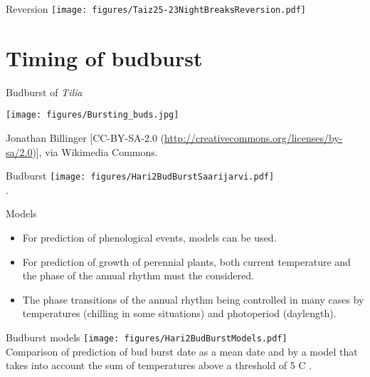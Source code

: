\documentclass[10pt]{beamer}
\begin{document}
\begin{frame}{Reversion}
    \centering
    \texttt{[image: figures/Taiz25-23NightBreaksReversion.pdf]}\\
    {\small \autocite[from][]{TaiZei2006}}
\end{frame}


\section{Timing of budburst}

\begin{frame}{Budburst of \emph{Tilia}}
    \begin{centering}
    \texttt{[image: figures/Bursting\_buds.jpg]}\\
    \end{centering}
    {\small Jonathan Billinger [CC-BY-SA-2.0 (\url{http://creativecommons.org/licenses/by-sa/2.0})], via Wikimedia Commons.}
\end{frame}

\begin{frame}{Budburst}
    \centering
    \texttt{[image: figures/Hari2BudBurstSaarijarvi.pdf]}\\
    {\small \autocite[from][]{Hari1991}.}
\end{frame}

\begin{frame}{Models}
    \begin{itemize}
        \item For prediction of phenological events, models can be used.
        \item For prediction of growth of perennial plants, both current
        temperature and the phase of the annual rhythm must the considered.
        \item The phase transitions of the annual rhythm being controlled
        in many cases by temperatures (chilling in some situations) and
        photoperiod (daylength).
    \end{itemize}
\end{frame}

\begin{frame}{Budburst models}
    \centering
    \texttt{[image: figures/Hari2BudBurstModels.pdf]}\\
    {\small Comparison of prediction of bud burst date as a mean date and by a model that takes into account
    the sum of temperatures above a threshold of 5 C \autocite[from][]{Hari1991}.}
\end{frame}
\end{document}
